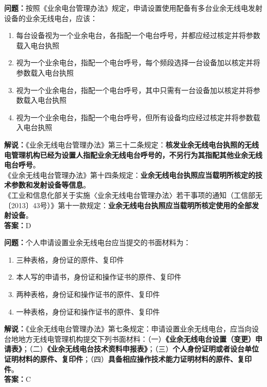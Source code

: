 \documentclass{ctexbook}
\begin{document}
\noindent\textbf{问题：}按照《业余电台管理办法》规定，申请设置使用配备有多台业余无线电发射设备的业余无线电台，应该：
\begin{enumerate}[label=\Alph*), leftmargin=3em]
	\item 每台设备视为一个业余电台，各指配一个电台呼号，并都应经过核定并将参数载入电台执照
	\item 视为一个业余电台，指配一个电台呼号，每个频段选择一台设备加以核定并将参数载入电台执照
	\item 视为一个业余电台，指配一个电台呼号，其中只需有一台设备加以核定并将参数载入电台执照
	\item 视为一个业余电台，指配一个电台呼号，但所有设备均应经过核定并将参数载入电台执照
\end{enumerate}
\noindent\textbf{解说：}《业余无线电台管理办法》第三十二条规定：\textbf{核发业余无线电台执照的无线电管理机构已经为设置人指配业余无线电台呼号的，不另行为其指配其他业余无线电台呼号}。\\
《业余无线电台管理办法》第十四条规定：\textbf{业余无线电台执照应当载明所核定的技术参数和发射设备等信息}。\\
《工业和信息化部关于实施〈业余无线电台管理办法〉若干事项的通知（工信部无〔2013〕43号）》第十一款规定：\textbf{业余无线电台执照应当载明所核定使用的全部发射设备}。\\\noindent\textbf{答案：}D


\bigskip


\noindent\textbf{问题：}个人申请设置业余无线电台应当提交的书面材料为：
\begin{enumerate}[label=\Alph*), leftmargin=3em]
	\item 三种表格，身份证的原件、复印件
	\item 本人写的申请书，身份证和操作证书的原件、复印件
	\item 两种表格，身份证和操作证书的原件、复印件
	\item 一种表格，身份证和操作证书的原件、复印件
\end{enumerate}
\noindent\textbf{解说：}《业余无线电台管理办法》第七条规定：申请设置业余无线电台，应当向设台地地方无线电管理机构提交下列书面材料：（一）\textbf{《业余无线电台设置（变更）申请表》}；（二）\textbf{《业余无线电台技术资料申报表》}；（三）\textbf{个人身份证明或者设台单位证明材料的原件、复印件}；（四）\textbf{具备相应操作技术能力证明材料的原件、复印件}。\\\noindent\textbf{答案：}C


\bigskip
\end{document}
